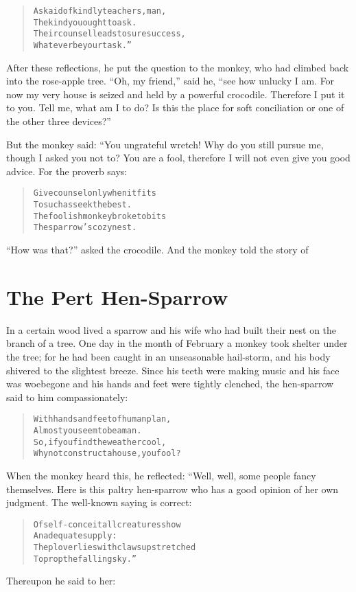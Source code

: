 \documentclass[article, twoside, 14pt]{memoir}
\renewenvironment{verbatim}{%
\begin{quote}%
\vskip -10pt%
\begin{alltt}\normalfont\large}{\end{alltt}%
\end{quote}%
\vskip -10pt
} %
\begin{document}
\begin{verbatim}
Ask aid of kindly teachers, man,
    The kind you ought to ask.
Their counsel leads to sure success,
    Whatever be your task.”
\end{verbatim}
After these reflections, he put the question to the monkey, who had
climbed back into the rose-apple tree. ``Oh, my friend,'' said he,
``see how unlucky I am. For now my very house is seized and held by a powerful crocodile. Therefore I put it to you. Tell me, what am I to do? Is this the place for soft conciliation or one of the other three devices?''

But the monkey said: “You ungrateful wretch! Why do you still
pursue me, though I asked you not to? You are a fool, therefore I
will not even give you good advice. For the proverb says:

\begin{verbatim}
Give counsel only when it fits
    To such as seek the best.
The foolish monkey broke to bits
    The sparrow's cozy nest.
\end{verbatim}
``How was that?'' asked the crocodile. And the monkey told the
story of

\chapter{The Pert Hen-Sparrow}

\label{s75}

In a certain wood lived a sparrow and his wife who had built their
nest on the branch of a tree. One day in the month of February a
monkey took shelter under the tree; for he had been caught in an
unseasonable hail-storm, and his body shivered to the slightest
breeze. Since his teeth were making music and his face was
woebegone and his hands and feet were tightly clenched, the
hen-sparrow said to him compassionately:

\begin{verbatim}
With hands and feet of human plan,
Almost you seem to be a man.
So, if you find the weather cool,
Why not construct a house, you fool?
\end{verbatim}
When the monkey heard this, he reflected: “Well, well, some people
fancy themselves. Here is this paltry hen-sparrow who has a good
opinion of her own judgment. The well-known saying is correct:

\begin{verbatim}
Of self-conceit all creatures show
    An adequate supply:
The plover lies with claws upstretched
    To prop the falling sky.”
\end{verbatim}
Thereupon he said to her:
\end{document}
